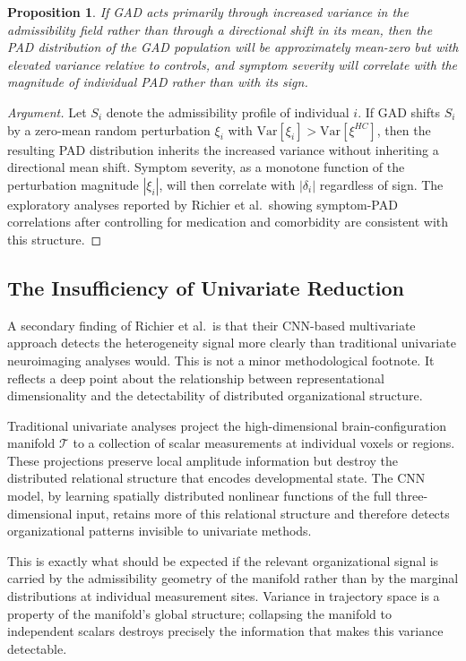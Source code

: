 \documentclass[11pt,a4paper]{article}
\theoremstyle{plain}
\newtheorem{proposition}[theorem]{Proposition}
\theoremstyle{definition}
\begin{document}
\begin{proposition}
If GAD acts primarily through increased variance in the admissibility field
rather than through a directional shift in its mean, then the PAD distribution of
the GAD population will be approximately mean-zero but with elevated variance relative
to controls, and symptom severity will correlate with the magnitude of individual
PAD rather than with its sign.
\end{proposition}

\begin{proof}[Argument]
Let $S_i$ denote the admissibility profile of individual $i$. If GAD shifts $S_i$
by a zero-mean random perturbation $\xi_i$ with $\mathrm{Var}[\xi_i] > \mathrm{Var}[\xi^{HC}]$,
then the resulting PAD distribution inherits the increased variance without inheriting
a directional mean shift. Symptom severity, as a monotone function of the perturbation
magnitude $|\xi_i|$, will then correlate with $|\delta_i|$ regardless of sign.
The exploratory analyses reported by Richier et al.\ showing symptom-PAD correlations
after controlling for medication and comorbidity are consistent with this structure.
\end{proof}

\subsection{The Insufficiency of Univariate Reduction}

A secondary finding of Richier et al.\ is that their CNN-based multivariate approach
detects the heterogeneity signal more clearly than traditional univariate neuroimaging
analyses would. This is not a minor methodological footnote. It reflects a deep point
about the relationship between representational dimensionality and the detectability of
distributed organizational structure.

Traditional univariate analyses project the high-dimensional brain-configuration manifold
$\mathcal{T}$ to a collection of scalar measurements at individual voxels or regions.
These projections preserve local amplitude information but destroy the distributed
relational structure that encodes developmental state. The CNN model, by learning
spatially distributed nonlinear functions of the full three-dimensional input, retains
more of this relational structure and therefore detects organizational patterns invisible
to univariate methods.

This is exactly what should be expected if the relevant organizational signal is carried
by the admissibility geometry of the manifold rather than by the marginal distributions
at individual measurement sites. Variance in trajectory space is a property of the
manifold's global structure; collapsing the manifold to independent scalars destroys
precisely the information that makes this variance detectable.
\end{document}

